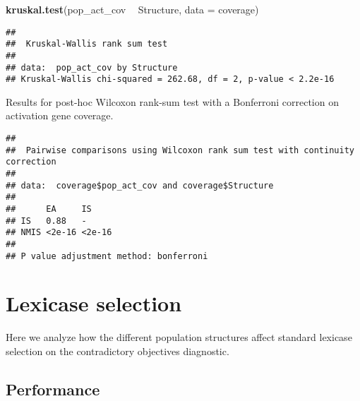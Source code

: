\documentclass[]{book}
\newenvironment{Shaded}{\begin{snugshade}}{\end{snugshade}}
\newcommand{\DataTypeTok}[1]{\textcolor[rgb]{0.13,0.29,0.53}{#1}}
\newcommand{\KeywordTok}[1]{\textcolor[rgb]{0.13,0.29,0.53}{\textbf{#1}}}
\newcommand{\NormalTok}[1]{#1}
\newcommand{\OperatorTok}[1]{\textcolor[rgb]{0.81,0.36,0.00}{\textbf{#1}}}
\newcommand{\OtherTok}[1]{\textcolor[rgb]{0.56,0.35,0.01}{#1}}
\newcommand{\StringTok}[1]{\textcolor[rgb]{0.31,0.60,0.02}{#1}}
\begin{document}
\begin{Shaded}
\begin{Highlighting}[]
\KeywordTok{kruskal.test}\NormalTok{(pop_act_cov }\OperatorTok{~}\StringTok{ }\NormalTok{Structure, }\DataTypeTok{data =}\NormalTok{ coverage)}
\end{Highlighting}
\end{Shaded}

\begin{verbatim}
## 
##  Kruskal-Wallis rank sum test
## 
## data:  pop_act_cov by Structure
## Kruskal-Wallis chi-squared = 262.68, df = 2, p-value < 2.2e-16
\end{verbatim}

Results for post-hoc Wilcoxon rank-sum test with a Bonferroni correction on activation gene coverage.

\begin{Shaded}
\end{Shaded}

\begin{verbatim}
## 
##  Pairwise comparisons using Wilcoxon rank sum test with continuity correction 
## 
## data:  coverage$pop_act_cov and coverage$Structure 
## 
##      EA     IS    
## IS   0.88   -     
## NMIS <2e-16 <2e-16
## 
## P value adjustment method: bonferroni
\end{verbatim}

\hypertarget{lexicase-selection-7}{%
\section{Lexicase selection}\label{lexicase-selection-7}}

Here we analyze how the different population structures affect standard lexicase selection on the contradictory objectives diagnostic.

\hypertarget{performance-5}{%
\subsection{Performance}\label{performance-5}}
\end{document}
